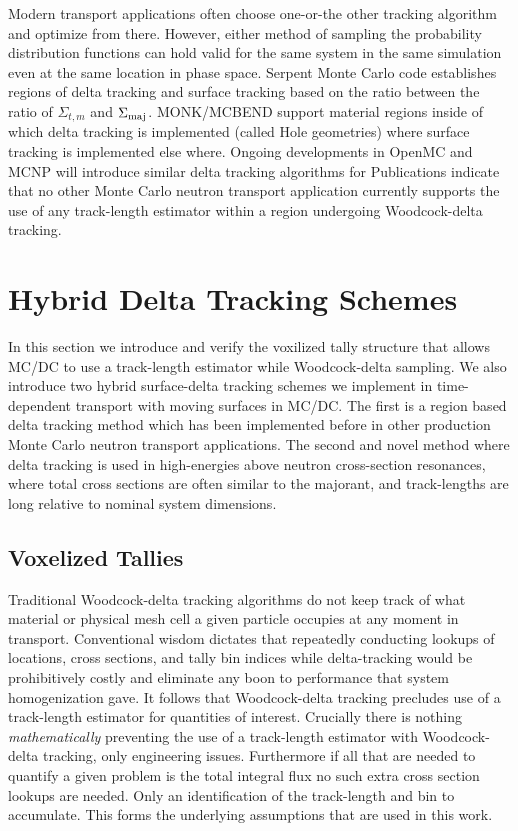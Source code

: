 Modern transport applications often choose one-or-the other tracking algorithm and optimize from there. However, either method of sampling the probability distribution functions can hold valid for the same system in the same simulation even at the same location in phase space.
Serpent Monte Carlo code establishes regions of delta tracking and surface tracking based on the ratio between the ratio of $\Sigma_{t,m}$ and $\Sigma_{\text{maj}}$.
MONK/MCBEND support material regions inside of which delta tracking is implemented (called Hole geometries) where surface tracking is implemented else where.
Ongoing developments in OpenMC and MCNP will introduce similar delta tracking algorithms for 
Publications indicate that no other Monte Carlo neutron transport application currently supports the use of any track-length estimator within a region undergoing Woodcock-delta tracking.


\section{Hybrid Delta Tracking Schemes}

In this section we introduce and verify the voxilized tally structure that allows MC/DC to use a track-length estimator while Woodcock-delta sampling.
We also introduce two hybrid surface-delta tracking schemes we implement in time-dependent transport with moving surfaces in MC/DC.
The first is a region based delta tracking method which has been implemented before in other production Monte Carlo neutron transport applications.
The second and novel method where delta tracking is used in high-energies above neutron cross-section resonances, where total cross sections are often similar to the majorant, and track-lengths are long relative to nominal system dimensions.


\subsection{Voxelized Tallies}

Traditional Woodcock-delta tracking algorithms do not keep track of what material or physical mesh cell a given particle occupies at any moment in transport.
Conventional wisdom dictates that repeatedly conducting lookups of locations, cross sections, and tally bin indices while delta-tracking would be prohibitively costly and eliminate any boon to performance that system homogenization gave.
It follows that Woodcock-delta tracking precludes use of a track-length estimator for quantities of interest.
Crucially there is nothing \textit{mathematically} preventing the use of a track-length estimator with Woodcock-delta tracking, only engineering issues.
Furthermore if all that are needed to quantify a given problem is the total integral flux no such extra cross section lookups are needed.
Only an identification of the track-length and bin to accumulate.
This forms the underlying assumptions that are used in this work.

